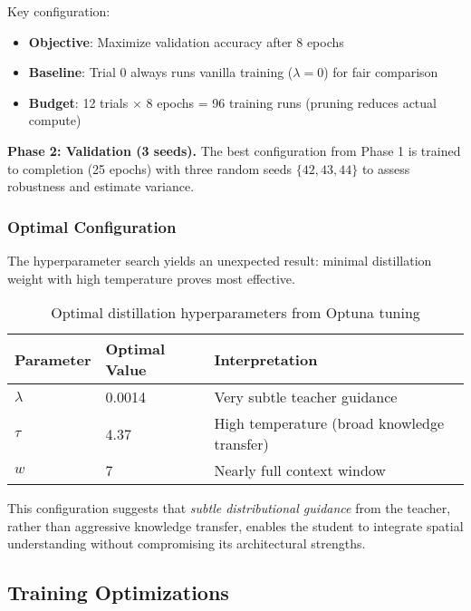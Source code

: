 Key configuration:
\begin{itemize}[noitemsep,topsep=0pt]
    \item \textbf{Objective}: Maximize validation accuracy after 8 epochs
    \item \textbf{Baseline}: Trial 0 always runs vanilla training ($\lambda = 0$) for fair comparison
    \item \textbf{Budget}: 12 trials $\times$ 8 epochs = 96 training runs (pruning reduces actual compute)
\end{itemize}

\textbf{Phase 2: Validation (3 seeds).} The best configuration from Phase 1 is trained to completion (25 epochs) with three random seeds $\{42, 43, 44\}$ to assess robustness and estimate variance.

\subsubsection{Optimal Configuration}

The hyperparameter search yields an unexpected result: minimal distillation weight with high temperature proves most effective.

\begin{table}[h]
    \centering
    \caption{Optimal distillation hyperparameters from Optuna tuning}
    \label{tab:optimal-hparams}
    \small
    \begin{tabular}{lll}
        \toprule
        \textbf{Parameter} & \textbf{Optimal Value} & \textbf{Interpretation}                     \\
        \midrule
        $\lambda$          & 0.0014                 & Very subtle teacher guidance                \\
        $\tau$             & 4.37                   & High temperature (broad knowledge transfer) \\
        $w$                & 7                      & Nearly full context window                  \\
        \bottomrule
    \end{tabular}
\end{table}

This configuration suggests that \emph{subtle distributional guidance} from the teacher, rather than aggressive knowledge transfer, enables the student to integrate spatial understanding without compromising its architectural strengths.

\subsection{Training Optimizations}
\label{sec:impl-opt}

